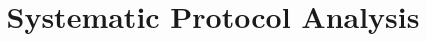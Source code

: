 \documentclass[10pt,twocolumn,letterpaper,inchmargins]{sig-alt-hotnets}
\begin{document}
\title{Systematic Protocol Analysis}
\author{}
\date{}
\maketitle

\begin{abstract}

\end{abstract}









\begin{footnotesize}


\end{footnotesize}
\end{document}
